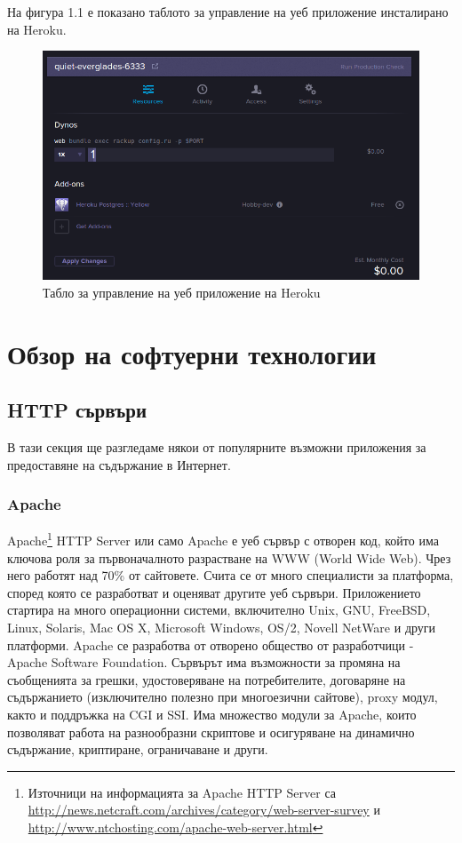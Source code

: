 \documentclass[pdftex,14pt,a4paper]{extreport}
\begin{document}
На фигура 1.1 е показано таблото за управление на уеб приложение инсталирано на Heroku.
\begin{figure}[H]
  \centering
  \includegraphics [scale=0.5]{./heroku_dashboard}
  \caption {Табло за управление на уеб приложение на Heroku}
\end{figure}
\section {Обзор на софтуерни технологии}
\subsection {HTTP сървъри}
В тази секция ще разгледаме някои от популярните възможни приложения за предоставяне на съдържание в Интернет.
\subsubsection {Apache}
Apache\footnote{Източници на информацията за Apache HTTP Server са \url{http://news.netcraft.com/archives/category/web-server-survey} и \url{http://www.ntchosting.com/apache-web-server.html}} HTTP Server или само Apache е уеб сървър с отворен код, който има ключова роля за първоначалното разрастване на WWW (World Wide Web). Чрез него работят над 70\% от сайтовете. Счита се от много специалисти за платформа, според която се разработват и оценяват другите уеб сървъри.
Приложението стартира на много операционни системи, включително Unix, GNU, FreeBSD, Linux, Solaris, Mac OS X, Microsoft Windows, OS/2, Novell NetWare и други платформи.
Apache се разработва от отворено общество от разработчици - Apache Software Foundation. Сървърът има възможности за промяна на съобщенията за грешки, удостоверяване на потребителите, договаряне на съдържанието (изключително полезно при многоезични сайтове), proxy модул, както и поддръжка на CGI и SSI. Има множество модули за Apache, които позволяват работа на разнообразни скриптове и осигуряване на динамично съдържание, криптиране, ограничаване и други.
\end{document}
